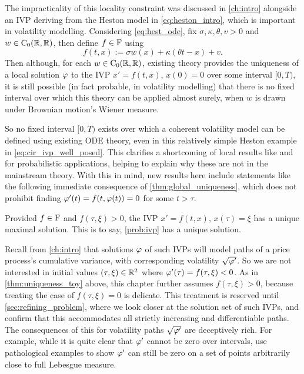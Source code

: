 The impracticality of this locality constraint was discussed in \autoref{ch:intro} alongside an IVP deriving from the Heston model in \autoref{eq:heston_intro}, which is important in volatility modelling. Considering \autoref{eq:hest_ode}, fix $\sigma,\kappa,\theta,v>0$ and $w\in\mathrm{C}_0(\mathbb{R},\mathbb{R})$, then define $f\in\mathrm{F}$ using
\begin{equation}\label{eq:cir_ivp_well_posed}
    f(t,x) := \sigma w(x) + \kappa(\theta t - x) + v.
\end{equation}
Then although, for each $w\in\mathrm{C}_0(\mathbb{R},\mathbb{R})$, existing theory provides the uniqueness of a local solution $\varphi$ to the IVP $x'=f(t,x)$, $x(0)=0$ over some interval $[0,T)$, it is still possible (in fact probable, in volatility modelling) that there is no fixed interval over which this theory can be applied almost surely, when $w$ is drawn under Brownian motion's Wiener measure.

So no fixed interval $[0,T)$ exists over which a coherent volatility model can be defined using existing ODE theory, even in this relatively simple Heston example in \autoref{eq:cir_ivp_well_posed}. This clarifies a shortcoming of local results like \cite{wend_1969} and \cite{cid_2009} for probabilistic applications, helping to explain why these are not in the mainstream theory. With this in mind, new results here include statements like the following immediate consequence of \autoref{thm:global_uniqueness}, which does not prohibit finding $\varphi'(t)=f(t,\varphi(t))=0$ for some $t>\tau$.

\begin{corollary}\label{thm:uniqueness_toy}
    Provided $f\in\mathrm{F}$ and $f(\tau,\xi)>0$, the IVP $x'=f(t,x)$, $x(\tau)=\xi$ has a unique maximal solution. This is to say, \autoref{prob:ivp} has a unique solution.
\end{corollary}

Recall from \autoref{ch:intro} that solutions $\varphi$ of such IVPs will model paths of a price process's cumulative variance, with corresponding volatility $\sqrt{\varphi'}$. So we are not interested in initial values $(\tau,\xi)\in\mathbb{R}^2$ where $\varphi'(\tau)=f(\tau,\xi)<0$. As in \autoref{thm:uniqueness_toy} above, this chapter further assumes $f(\tau,\xi)>0$, because treating the case of $f(\tau,\xi)=0$ is delicate. This treatment is reserved until \autoref{sec:refining_problem}, where we look closer at the solution set of such IVPs, and confirm that this accommodates all strictly increasing and differentiable paths. The consequences of this for volatility paths $\sqrt{\varphi'}$ are deceptively rich. For example, while it is quite clear that $\varphi'$ cannot be zero over intervals, \cite{royden_2010} use pathological examples to show $\varphi'$ can still be zero on a set of points arbitrarily close to full Lebesgue measure.

